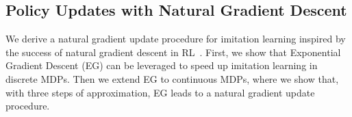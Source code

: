 \documentclass{article}
\begin{document}
\subsection{Policy Updates with Natural Gradient Descent}
We derive a natural gradient update procedure for imitation learning inspired by the success of natural gradient descent in RL~\cite{kakade2002natural,bagnell2003covariant,schulman2015trust}. First, we show that Exponential Gradient Descent (EG) can be leveraged to speed up imitation learning in discrete MDPs. Then we extend EG to continuous MDPs, where we show that, with three steps of approximation, EG leads to a natural gradient update procedure. 
\end{document}
